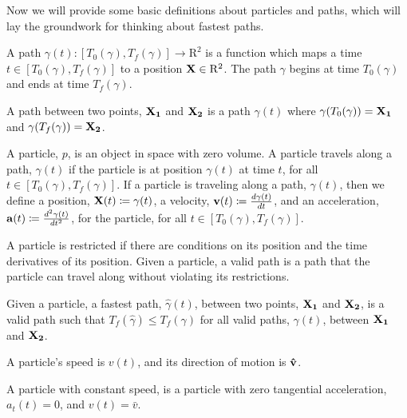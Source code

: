 Now we will provide some basic definitions about particles and paths, which will lay the groundwork for thinking about fastest paths.

\begin{definition}
  A path $\gamma(t): [T_0(\gamma), T_f(\gamma)] \to \mathrm{R}^2$ is a function which maps a time $t \in [T_0(\gamma), T_f(\gamma)]$ to a position $\mathbf{X} \in \mathrm{R}^2$. The path $\gamma$ begins at time $T_0(\gamma)$ and ends at time $T_f(\gamma)$.
\end{definition}

\begin{definition}
  A path between two points, $\mathbf{X_1}$ and $\mathbf{X_2}$ is a path $\gamma(t)$ where $\gamma(T_0(\gamma)) = \mathbf{X_1}$ and $\gamma(T_f(\gamma)) = \mathbf{X_2}$.
\end{definition}

\begin{definition}
  A particle, $p$, is an object in space with zero volume. A particle travels along a path, $\gamma(t)$ if the particle is at position $\gamma(t)$ at time $t$, for all $t \in [T_0(\gamma), T_f(\gamma)]$. If a particle is traveling along a path, $\gamma(t)$, then we define a position, $\mathbf{X}(t) \coloneqq \gamma(t)$, a velocity, $\mathbf{v}(t) \coloneqq \frac{d\gamma(t)}{dt}$, and an acceleration, $\mathbf{a}(t) \coloneqq \frac{d^2\gamma(t)}{dt^2}$, for the particle, for all $t \in [T_0(\gamma), T_f(\gamma)]$.

  A particle is restricted if there are conditions on its position and the time derivatives of its position. Given a particle, a valid path is a path that the particle can travel along without violating its restrictions.
\end{definition}

\begin{definition}
  Given a particle, a fastest path, $\hat{\gamma}(t)$, between two points, $\mathbf{X_1}$ and $\mathbf{X_2}$, is a valid path such that $T_f(\hat{\gamma}) \leq T_f(\gamma)$ for all valid paths, $\gamma(t)$, between $\mathbf{X_1}$ and $\mathbf{X_2}$.
\end{definition}

\begin{definition}
  A particle's speed is $v(t)$, and its direction of motion is $\mathbf{\hat{v}}$.

  A particle with constant speed, is a particle with zero tangential acceleration, $a_t(t) = 0$, and $v(t) = \bar{v}$.
\end{definition}

